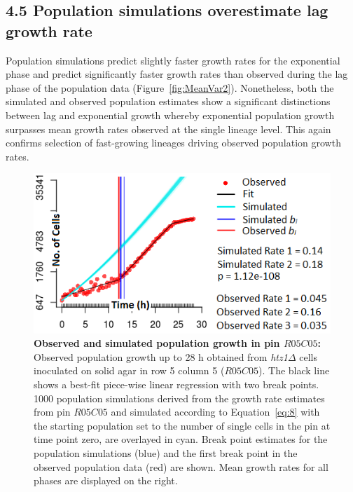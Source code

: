 \documentclass{bioinfo}
\begin{document}
{\vspace{-0.5em}
\subsection*{4.5 Population simulations overestimate lag growth rate}

Population simulations predict slightly faster growth rates for the exponential phase and predict significantly faster growth rates than observed during the lag phase of the population data (Figure~\ref{fig:MeanVar2}). Nonetheless, both the simulated and observed population estimates show a significant distinctions between lag and exponential growth whereby exponential population growth surpasses mean growth rates observed at the single lineage level. This again confirms selection of fast-growing lineages driving observed population growth rates. 

\vspace{-1em}
\begin{figure}[H]
\centering
\includegraphics[width=1\linewidth]{Ch2ObsSimComp.png}
\vspace{-2em}
\caption{\footnotesize{\textbf{Observed and simulated population growth in pin $R05C05$:} Observed population growth up to 28 h obtained from \textit{htz1}$\Delta$ cells inoculated on solid agar in row 5 column 5 ($R05C05$). The black line shows a best-fit piece-wise linear regression with two break points. 1000 population simulations derived from the growth rate estimates from pin $R05C05$ and simulated according to Equation~\ref{eq:8} with the starting population set to the number of single cells in the pin at time point zero, are overlayed in cyan. Break point estimates for the population simulations (blue) and the first break point in the observed population data (red) are shown. Mean growth rates for all phases are displayed on the right.}}
\label{fig:PopEst2}
\end{figure}
\vspace{-3em}

}
\end{document}

